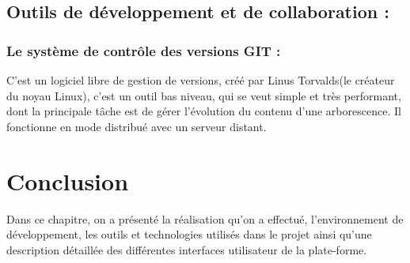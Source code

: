 \begin{itemize}
\begin{itemize}
		\medskip
\end{itemize}
\subsection{Outils de développement et de collaboration :}



\subsubsection{Le système de contrôle des versions GIT :} C'est un logiciel libre de gestion de versions, créé par Linus Torvalds(le créateur du noyau Linux), c’est un outil bas niveau, qui se veut simple et très performant, dont la principale tâche est de gérer l’évolution du contenu d’une arborescence. Il fonctionne en mode distribué avec un serveur distant\cite{wiki:git}.
















\clearpage





 


\section{Conclusion}
Dans ce chapitre, on a présenté la réalisation qu'on a effectué, l’environnement de développement, les outils et technologies utilisés dans le projet ainsi qu'une description détaillée des différentes interfaces utilisateur de la plate-forme.


